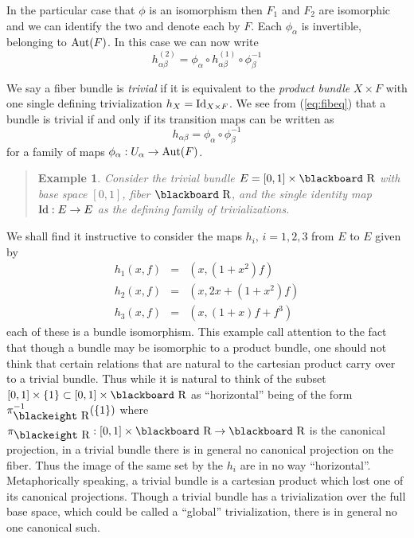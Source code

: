 \documentclass[12pt,titlepage]{article}
\def\bbf#1{\hbox{\blackboard #1}}
\def\bbfeight#1{\hbox{\blackeight #1}}
\def\lR{\bbf R}
\def\lRe{\bbfeight R}
\def\Aut{\hbox{Aut}}
\def\Id{\hbox{Id}}
\newtheorem{eg}{Example}
\newenvironment{example}{\begin{quote}\begin{eg}}{\end{eg}\end{quote}}
\begin{document}
In the particular case that \(\phi\) is an isomorphism then \(F_1\) and
\(F_2\) are isomorphic and we can identify the two and denote each by
\(F\). Each \(\phi_\alpha\) is invertible, belonging to \(\Aut(F)\). In
this
case we can now write
\begin{equation}\label{eq:fibeq}
h^{(2)}_{\alpha\beta}= \phi_\alpha\circ
h^{(1)}_{\alpha\beta}\circ\phi_\beta^{-1}
\end{equation}%


We say a fiber bundle is {\em trivial\/}
%
 if it is equivalent to the {\em
product bundle\/}
%
 \(X\times F\) with one single defining 
trivialization
\(h_X = \Id_{X\times F}\).
We see from (\ref{eq:fibeq}) that a bundle is
trivial if and only if its transition maps can be written as
\[
h_{\alpha\beta} =
\phi_\alpha\circ\phi_\beta^{-1}
\]
 for a family of maps  \(\phi_\alpha:
U_\alpha \to \Aut(F)\).
\begin{example}\label{ex:trivnottriv}
Consider the trivial bundle \(E=[0,1]\times\lR\) with base space
\([0,1]\),
fiber \(\lR\), and the single identity map \(\Id:E\to E\) 
as the defining family of  trivializations.
\end{example}%

We shall find it instructive to consider the maps \(h_i,\,i=1,2,3\) 
from \(E\) to \(E\) given by
\begin{eqnarray*}
h_1(x,f) &=& (x, (1+x^2)f) \\ 
h_2(x,f) &=& (x, 2x+(1+x^2)f) \\ 
h_3(x,f) &=& (x, (1+x)f + f^3)
\end{eqnarray*}%
each of these is a bundle isomorphism. This example call attention to
the fact that though a bundle may be isomorphic to a product bundle, one
should not think that certain relations that are natural to the
cartesian product carry over to a trivial bundle. Thus while it is
natural to think of the subset \([0,1]\times\{1\}\subset
[0,1]\times\lR\) as ``horizontal'' being of the form \(\pi_{\lRe}^{-1}
(\{1\})\) where \(\pi_{\lRe}:[0,1]\times\lR\to \lR\) is the canonical
projection, in a trivial bundle there is in general 
no canonical projection on the
fiber.  Thus the image of the same set by the \(h_i\) are in no way
``horizontal''. Metaphorically speaking, a trivial bundle is a cartesian
product which lost one of its canonical projections.
Though a trivial bundle has a  trivialization over the 
full base space, which could be called a ``global'' trivialization,
there is in general no one canonical such.
\end{document}
